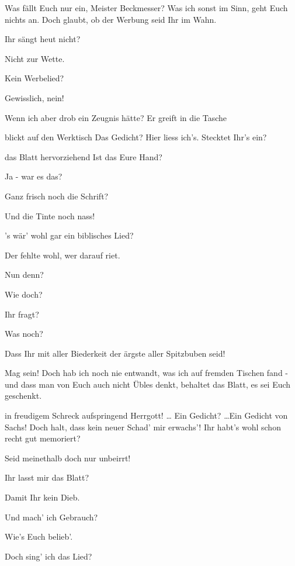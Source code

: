 \begin{drama}
\Sachsspeaks
Was fällt Euch nur ein, Meister Beckmesser?
Was ich sonst im Sinn, geht Euch nichts an.
Doch glaubt, ob der Werbung seid Ihr im Wahn.

\Beckmesserspeaks
Ihr sängt heut nicht?

\Sachsspeaks
Nicht zur Wette.

\Beckmesserspeaks
Kein Werbelied?

\Sachsspeaks
Gewisslich, nein!

\Beckmesserspeaks
Wenn ich aber drob ein Zeugnis hätte?
Er greift in die Tasche

\Sachsspeaks
blickt auf den Werktisch
Das Gedicht? Hier liess ich's. Stecktet Ihr's ein?

\Beckmesserspeaks
das Blatt hervorziehend
Ist das Eure Hand?

\Sachsspeaks
Ja - war es das?

\Beckmesserspeaks
Ganz frisch noch die Schrift?

\Sachsspeaks
Und die Tinte noch nass!

\Beckmesserspeaks
's wär' wohl gar ein biblisches Lied?

\Sachsspeaks
Der fehlte wohl, wer darauf riet.

\Beckmesserspeaks
Nun denn?

\Sachsspeaks
Wie doch?

\Beckmesserspeaks
Ihr fragt?

\Sachsspeaks
Was noch?

\Beckmesserspeaks
Dass Ihr mit aller Biederkeit
der ärgste aller Spitzbuben seid!

\Sachsspeaks
Mag sein! Doch hab ich noch nie entwandt,
was ich auf fremden Tischen fand -
und dass man von Euch auch nicht Übles denkt,
behaltet das Blatt, es sei Euch geschenkt.

\Beckmesserspeaks
in freudigem Schreck aufspringend
Herrgott! \ldots 
Ein Gedicht? \ldots  Ein Gedicht von Sachs!
Doch halt, dass kein neuer Schad' mir erwachs'!
Ihr habt's wohl schon recht gut memoriert?

\Sachsspeaks
Seid meinethalb doch nur unbeirrt!

\Beckmesserspeaks
Ihr lasst mir das Blatt?

\Sachsspeaks
Damit Ihr kein Dieb.

\Beckmesserspeaks
Und mach' ich Gebrauch?

\Sachsspeaks
Wie's Euch belieb'.

\Beckmesserspeaks
Doch sing' ich das Lied?


\end{drama}

